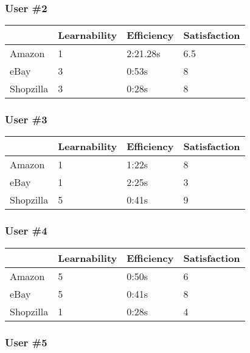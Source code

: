 \documentclass[11pt, oneside]{article}
\begin{document}
\subsubsection{User \#2}

\begin{center}
\begin{tabular}{| l | l | l | l |}
    \hline
     & Learnability & Efficiency & Satisfaction \\ \hline
    Amazon & 1 & 2:21.28s & 6.5 \\ \hline
    eBay & 3 & 0:53s & 8 \\ \hline
    Shopzilla & 3 & 0:28s & 8 \\\hline
\end{tabular}
\end{center}

\subsubsection{User \#3}

\begin{center}
\begin{tabular}{| l | l | l | l |}
    \hline
     & Learnability & Efficiency & Satisfaction \\ \hline
    Amazon & 1 & 1:22s & 8 \\ \hline
    eBay & 1 & 2:25s & 3 \\ \hline
    Shopzilla & 5 & 0:41s & 9 \\\hline
\end{tabular}
\end{center}

\subsubsection{User \#4}

\begin{center}
\begin{tabular}{| l | l | l | l |}
    \hline
     & Learnability & Efficiency & Satisfaction \\ \hline
    Amazon & 5 & 0:50s & 6 \\ \hline
    eBay & 5 & 0:41s & 8 \\ \hline
    Shopzilla & 1 & 0:28s & 4 \\\hline
\end{tabular}
\end{center}

\subsubsection{User \#5}
\end{document}
